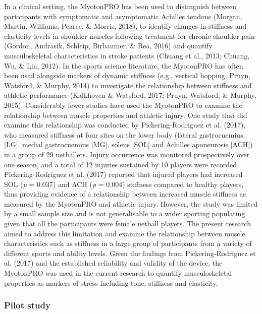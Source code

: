 \documentclass[
  english,
  man,floatsintext]{apa6}
\begin{document}
In a clinical setting, the MyotonPRO has been used to distinguish between participants with symptomatic and asymptomatic Achilles tendons (Morgan, Martin, Williams, Pearce, \& Morris, 2018), to identify changes in stiffness and elasticity levels in shoulder muscles following treatment for chronic shoulder pain (Gordon, Andrasik, Schleip, Birbaumer, \& Rea, 2016) and quantify musculoskeletal characteristics in stroke patients (Chuang et al., 2013; Chuang, Wu, \& Lin, 2012).
In the sports science literature, the MyotonPRO has often been used alongside markers of dynamic stiffness (e.g., vertical hopping, Pruyn, Watsford, \& Murphy, 2014) to investigate the relationship between stiffness and athletic performance (Kalkhoven \& Watsford, 2017; Pruyn, Watsford, \& Murphy, 2015).
Considerably fewer studies have used the MyotonPRO to examine the relationship between muscle properties and athletic injury.
One study that did examine this relationship was conducted by Pickering-Rodriguez et al. (2017), who measured stiffness at four sites on the lower body (lateral gastrocnemius {[}LG{]}, medial gastrocnemius {[}MG{]}, soleus {[}SOL{]} and Achilles aponeurosis {[}ACH{]}) in a group of 29 netballers.
Injury occurrence was monitored prospectively over one season, and a total of 12 injuries sustained by 10 players were recorded.
Pickering-Rodriguez et al. (2017) reported that injured players had increased SOL (\emph{p} = 0.037) and ACH (\emph{p} = 0.004) stiffness compared to healthy players, thus providing evidence of a relationship between increased muscle stiffness as measured by the MyotonPRO and athletic injury.
However, the study was limited by a small sample size and is not generalisable to a wider sporting populating given that all the participants were female netball players.
The present research aimed to address this limitation and examine the relationship between muscle characteristics such as stiffness in a large group of participants from a variety of different sports and ability levels.
Given the findings from Pickering-Rodriguez et al. (2017) and the established reliability and validity of the device, the MyotonPRO was used in the current research to quantify musculoskeletal properties as markers of stress including tone, stiffness and elasticity.

\hypertarget{pilot-study}{%
\subsubsection{Pilot study}\label{pilot-study}}
\end{document}
